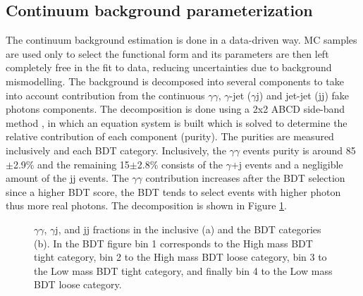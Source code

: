 \subsection{Continuum background parameterization}
\label{HHyybb:Modelling:Bkg}

The continuum background estimation is done in a data-driven way. MC samples are used only to select the functional form and its parameters are then left completely free in the fit to data, reducing uncertainties due to background mismodelling. The background is decomposed into several components to take into account contribution from the continuous $\gamma\gamma$, $\gamma$-jet ($\gamma$j) and jet-jet (jj) fake photons components. The decomposition is done using a 2x2 ABCD side-band method \cite{ABCD}, in which an equation system is built which is solved to determine the relative contribution of each component (purity). The purities are measured inclusively and each BDT category. Inclusively, the $\gamma\gamma$ events purity is around 85$\pm$2.9\% and the remaining 15$\pm$2.8\% consists of the $\gamma$+j events and a negligible amount of the jj events. The $\gamma\gamma$ contribution increases after the BDT selection since a higher BDT score, the BDT tends to select events with higher photon \pT thus more real photons. The decomposition is shown in Figure \ref{fig:HHyybb:Modelling:Bkg:Decom}. 

\begin{figure}[htbp]
    \centering
    \caption{$\gamma\gamma$, $\gamma$j, and jj fractions in the inclusive (a) and the BDT categories (b). In the BDT figure bin 1 corresponds to the High mass BDT tight category, bin 2 to the High mass BDT loose category, bin 3 to the Low mass BDT tight category, and finally bin 4 to the Low mass BDT loose category.}
    \label{fig:HHyybb:Modelling:Bkg:Decom}
\end{figure}

